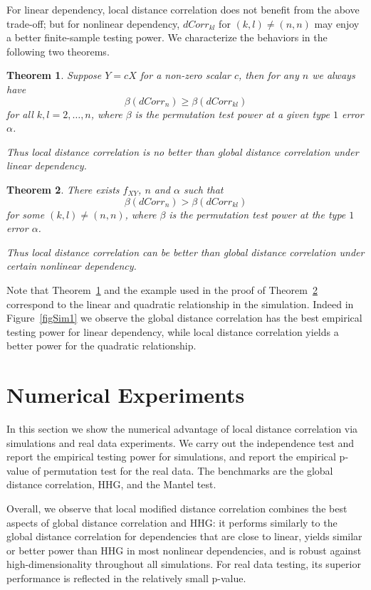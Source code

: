 \documentclass[12pt]{article}
\newtheorem{thm}{Theorem}
\begin{document}
For linear dependency, local distance correlation does not benefit from the above trade-off; but for nonlinear dependency, $dCorr_{kl}$ for $(k,l) \neq (n,n)$ may enjoy a better finite-sample testing power. We characterize the behaviors in the following two theorems.

\begin{thm}
\label{thm2}
Suppose $Y=cX$ for a non-zero scalar $c$, then for any $n$ we always have
\begin{equation}
\label{equ1}
\beta(dCorr_{n}) \geq \beta(dCorr_{kl})
\end{equation}
for all $k,l=2,\ldots,n$, where $\beta$ is the permutation test power at a given type $1$ error $\alpha$.

Thus local distance correlation is no better than global distance correlation under linear dependency.
\end{thm}

\begin{thm}
\label{thm3}
There exists $f_{XY}$, $n$ and $\alpha$ such that 
\begin{equation}
\label{equ2}
\beta(dCorr_{n}) > \beta(dCorr_{kl})
\end{equation}
for some $(k,l) \neq (n,n)$, where $\beta$ is the permutation test power at the type $1$ error $\alpha$.

Thus local distance correlation can be better than global distance correlation under certain nonlinear dependency.
\end{thm}
Note that Theorem~\ref{thm2} and the example used in the proof of Theorem~\ref{thm3} correspond to the linear and quadratic relationship in the simulation. Indeed in Figure~\ref{figSim1} we observe the global distance correlation has the best empirical testing power for linear dependency, while local distance correlation yields a better power for the quadratic relationship.

\section{Numerical Experiments}
\label{numer}
In this section we show the numerical advantage of local distance correlation via simulations and real data experiments. We carry out the independence test and report the empirical testing power for simulations, and report the empirical p-value of permutation test for the real data. The benchmarks are the global distance correlation, HHG, and the Mantel test. 

Overall, we observe that local modified distance correlation combines the best aspects of global distance correlation and HHG: it performs similarly to the global distance correlation for dependencies that are close to linear, yields similar or better power than HHG in most nonlinear dependencies, and is robust against high-dimensionality throughout all simulations. For real data testing, its superior performance is reflected in the relatively small p-value.
\end{document}

